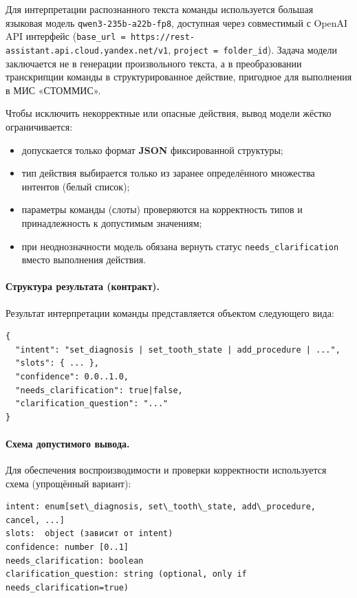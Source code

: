 Для интерпретации распознанного текста команды используется большая языковая модель
\texttt{qwen3-235b-a22b-fp8}, доступная через совместимый с OpenAI API интерфейс
(\texttt{base\_url = https://rest-assistant.api.cloud.yandex.net/v1}, \texttt{project = folder\_id}).
Задача модели заключается не в генерации произвольного текста, а в преобразовании транскрипции команды
в структурированное действие, пригодное для выполнения в МИС «СТОММИС».

Чтобы исключить некорректные или опасные действия, вывод модели жёстко ограничивается:
\begin{itemize}
    \item допускается только формат \textbf{JSON} фиксированной структуры;
    \item тип действия выбирается только из заранее определённого множества интентов (белый список);
    \item параметры команды (слоты) проверяются на корректность типов и принадлежность к допустимым значениям;
    \item при неоднозначности модель обязана вернуть статус \texttt{needs\_clarification} вместо выполнения действия.
\end{itemize}

\paragraph{Структура результата (контракт).}
Результат интерпретации команды представляется объектом следующего вида:
\begin{verbatim}
{
  "intent": "set_diagnosis | set_tooth_state | add_procedure | ...",
  "slots": { ... },
  "confidence": 0.0..1.0,
  "needs_clarification": true|false,
  "clarification_question": "..."
}
\end{verbatim}

\paragraph{Схема допустимого вывода.}
Для обеспечения воспроизводимости и проверки корректности используется схема (упрощённый вариант):
\begin{lstlisting}[breaklines=true]
intent: enum[set\_diagnosis, set\_tooth\_state, add\_procedure, cancel, ...]
slots:  object (зависит от intent)
confidence: number [0..1]
needs_clarification: boolean
clarification_question: string (optional, only if needs_clarification=true)
\end{lstlisting}

